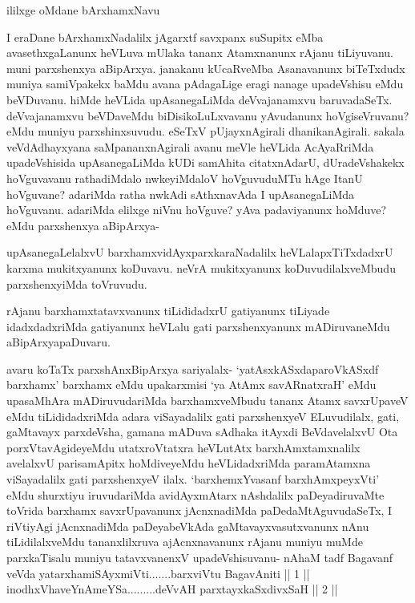 \begin{center}
ililxge oMdane bArxhamxNavu
\end{center}


\begin{artha}
I eraDane bArxhamxNadalilx jAgarxtf savxpanx suSupitx eMba avasethxgaLanunx heVLuva mUlaka tananx Atamxnanunx rAjanu tiLiyuvanu. muni parxshenxya aBipArxya. janakanu kUcaRveMba Asanavanunx biTeTxdudx muniya samiVpakekx baMdu avana pAdagaLige eragi nanage upadeVshisu eMdu beVDuvanu. hiMde heVLida upAsanegaLiMda deVvajanamxvu baruvadaSeTx. deVvajanamxvu beVDaveMdu biDisikoLuLxvavanu yAvudanunx hoVgiseVruvanu? eMdu muniyu parxshinxsuvudu. eSeTxV pUjayxnAgirali dhanikanAgirali. sakala veVdAdhayxyana saMpananxnAgirali avanu meVle heVLida AcAyaRriMda upadeVshisida upAsanegaLiMda kUDi samAhita citatxnAdarU, dUradeVshakekx hoVguvavanu rathadiMdalo nwkeyiMdaloV hoVguvuduMTu hAge ItanU hoVguvane? adariMda ratha nwkAdi sAthxnavAda I upAsanegaLiMda hoVguvanu. adariMda elilxge niVnu hoVguve? yAva padaviyanunx hoMduve? eMdu parxshenxya aBipArxya-
\end{artha}%

\begin{artha}
upAsanegaLelalxvU barxhamxvidAyxparxkaraNadalilx heVLalapxTiTxdadxrU karxma mukitxyanunx koDuvavu. neVrA mukitxyanunx koDuvudilalxveMbudu parxshenxyiMda toVruvudu. 
\end{artha}


\begin{artha}
rAjanu barxhamxtatavxvanunx tiLididadxrU gatiyanunx tiLiyade idadxdadxriMda gatiyanunx heVLalu gati parxshenxyanunx mADiruvaneMdu aBipArxyapaDuvaru. 
\end{artha}

\begin{artha}
avaru koTaTx parxshAnxBipArxya sariyalalx- `yatAsxkASxdaparoVkASxdf barxhamx' barxhamx eMdu upakarxmisi `ya AtAmx savARnatxraH' eMdu upasaMhAra mADiruvudariMda barxhamxveMbudu tananx Atamx savxrUpaveV eMdu tiLididadxriMda adara viSayadalilx gati parxshenxyeV ELuvudilalx, gati, gaMtavayx parxdeVsha, gamana mADuva sAdhaka itAyxdi BeVdavelalxvU Ota porxVtavAgideyeMdu utatxroVtatxra heVLutAtx barxhAmxtamxnalilx avelalxvU parisamApitx hoMdiveyeMdu heVLidadxriMda paramAtamxna viSayadalilx gati parxshenxyeV ilalx. `barxhemxYvasanf barxhAmxpeyxVti' eMdu shurxtiyu iruvudariMda avidAyxmAtarx nAshdalilx paDeyadiruvaMte toVrida barxhamx savxrUpavanunx jAcnxnadiMda paDedaMtAguvudaSeTx, I riVtiyAgi jAcnxnadiMda paDeyabeVkAda gaMtavayxvasutxvanunx nAnu tiLidilalxveMdu tananxlilxruva ajAcnxnavanunx rAjanu muniyu muMde parxkaTisalu muniyu tatavxvanenxV upadeVshisuvanu-
nAhaM tadf Bagavanf veVda yatarxhamiSAyxmiVti.......barxviVtu BagavAniti || 1 || \\
inodhxVhaveYnAmeYSa.........deVvAH parxtayxkaSxdivxSaH || 2 ||
\end{artha}

